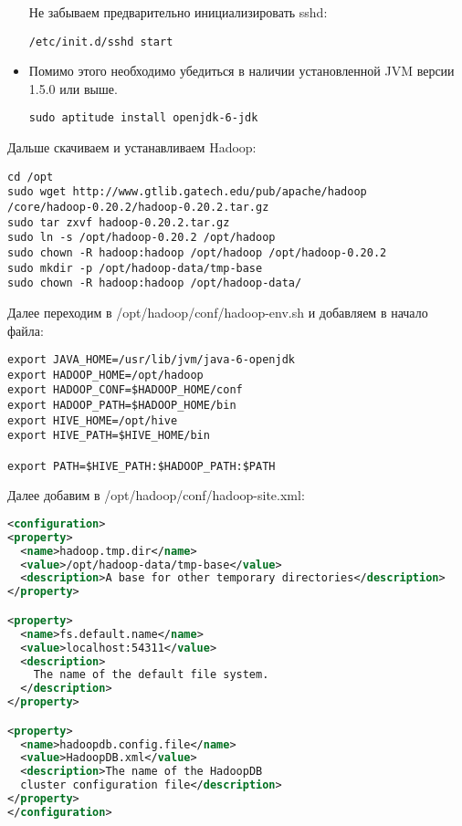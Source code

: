 \begin{itemize}
Не забываем предварительно инициализировать sshd:
\begin{lstlisting}[label=lst:haddop6,caption=Запуск sshd]
/etc/init.d/sshd start
\end{lstlisting}

\item Помимо этого необходимо убедиться в наличии установленной JVM версии 1.5.0 или выше.
\begin{lstlisting}[label=lst:haddop7,caption=Устанавливаем JVM]
sudo aptitude install openjdk-6-jdk
\end{lstlisting}
\end{itemize}

Дальше скачиваем и устанавливаем Hadoop:
\begin{lstlisting}[label=lst:haddop8,caption=Устанавливаем Hadoop]
cd /opt
sudo wget http://www.gtlib.gatech.edu/pub/apache/hadoop
/core/hadoop-0.20.2/hadoop-0.20.2.tar.gz
sudo tar zxvf hadoop-0.20.2.tar.gz
sudo ln -s /opt/hadoop-0.20.2 /opt/hadoop
sudo chown -R hadoop:hadoop /opt/hadoop /opt/hadoop-0.20.2
sudo mkdir -p /opt/hadoop-data/tmp-base
sudo chown -R hadoop:hadoop /opt/hadoop-data/
\end{lstlisting}

Далее переходим в /opt/hadoop/conf/hadoop-env.sh и добавляем в начало файла:
\begin{lstlisting}[label=lst:haddop9,caption=Указываем переменные окружения]
export JAVA_HOME=/usr/lib/jvm/java-6-openjdk
export HADOOP_HOME=/opt/hadoop
export HADOOP_CONF=$HADOOP_HOME/conf
export HADOOP_PATH=$HADOOP_HOME/bin
export HIVE_HOME=/opt/hive
export HIVE_PATH=$HIVE_HOME/bin

export PATH=$HIVE_PATH:$HADOOP_PATH:$PATH
\end{lstlisting}

Далее добавим в /opt/hadoop/conf/hadoop-site.xml:
\begin{lstlisting}[language=XML,label=lst:haddop10,caption=Настройки hadoop]
<configuration>
<property>
  <name>hadoop.tmp.dir</name>
  <value>/opt/hadoop-data/tmp-base</value>
  <description>A base for other temporary directories</description>
</property>

<property>
  <name>fs.default.name</name>
  <value>localhost:54311</value>
  <description>
    The name of the default file system.
  </description>
</property>

<property>
  <name>hadoopdb.config.file</name>
  <value>HadoopDB.xml</value>
  <description>The name of the HadoopDB
  cluster configuration file</description>
</property>
</configuration>
\end{lstlisting}

